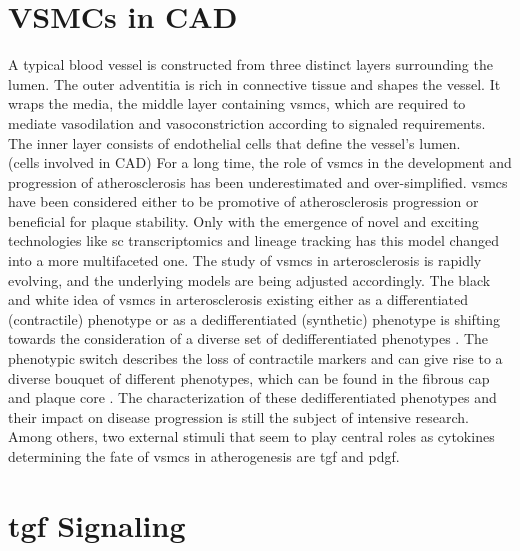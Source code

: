 \section{VSMCs in CAD}
\label{sec:haosms}
A typical blood vessel is constructed from three distinct layers surrounding the lumen. The outer adventitia is rich in connective tissue and shapes the vessel. It wraps the media, the middle layer containing \acp{vsmc}, which are required to mediate vasodilation and vasoconstriction according to signaled requirements. The inner layer consists of endothelial cells that define the vessel's lumen. \cite{tuckerAnatomyBloodVessels2022a, yapSixShadesVascular2021}\\
(cells involved in CAD) For a long time, the role of \acp{vsmc} in the development and progression of atherosclerosis has been underestimated and over-simplified. \acp{vsmc} have been considered either to be promotive of atherosclerosis progression or beneficial for plaque stability. Only with the emergence of novel and exciting technologies like \ac{sc} transcriptomics and lineage tracking has this model changed into a more multifaceted one. \cite{liuSmoothMuscleCell2019, grootaertVascularSmoothMuscle2021, yapSixShadesVascular2021} The study of \acp{vsmc} in arterosclerosis is rapidly evolving, and the underlying models are being adjusted accordingly. The black and white idea of \acp{vsmc} in arterosclerosis existing either as a differentiated (contractile) phenotype or as a dedifferentiated (synthetic) phenotype is shifting towards the consideration of a diverse set of dedifferentiated phenotypes \cite{liuSmoothMuscleCell2019, grootaertVascularSmoothMuscle2021, yapSixShadesVascular2021}. The phenotypic switch describes the loss of contractile markers and can give rise to a diverse bouquet of different phenotypes, which can be found in the fibrous cap and plaque core \cite{grootaertVascularSmoothMuscle2021}. The characterization of these dedifferentiated phenotypes and their impact on disease progression is still the subject of intensive research.\\
Among others, two external stimuli that seem to play central roles as cytokines determining the fate of \acp{vsmc} in atherogenesis are \ac{tgf} and \ac{pdgf}.


\section{\acs{tgf} Signaling}
\label{sec:tgf}

